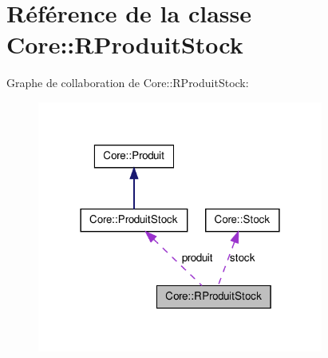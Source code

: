 \hypertarget{class_core_1_1_r_produit_stock}{
\section{Référence de la classe Core::RProduitStock}
\label{d1/da9/class_core_1_1_r_produit_stock}
}


Graphe de collaboration de Core::RProduitStock:\nopagebreak
\begin{figure}[H]
\begin{center}
\leavevmode
\includegraphics[width=266pt]{d4/d21/class_core_1_1_r_produit_stock__coll__graph}
\end{center}
\end{figure}
